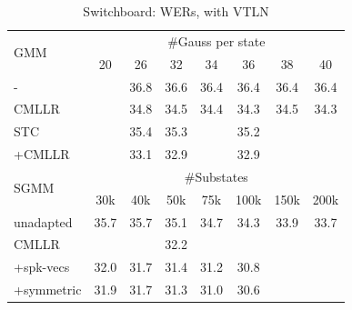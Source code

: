 \documentclass{article}
\begin{document}
\begin{table}[h]
 \renewcommand\arraycolsep{-0.1in}
  \begin{tabular}{|l|ccccccc|}           \hline 
 \multirow{2}{*}{GMM}
            &     \multicolumn{7}{c|}{\#Gauss per state}     \\
            &   20  &  26    &   32  &  34    &   36    &   38   & 40   \\  \cline{2-8}
 -          &       & 36.8   & 36.6  & 36.4   &  36.4   &  36.4  & 36.4  \\  
 CMLLR      &       & 34.8   & 34.5  & 34.4   & 34.3    & 34.5   & 34.3  \\
 STC        &       & 35.4   & 35.3  &        &  35.2   &        &      \\
    +CMLLR  &       & 33.1   & 32.9  &        &  32.9   &        &      \\ \hline
 \multirow{2}{*}{SGMM} 
            &    \multicolumn{7}{c|}{\#Substates}                      \\
            & 30k   &  40k  &   50k  &  75k   &  100k  &  150k  & 200k \\  \cline{2-8}
 unadapted  &  35.7 & 35.7  &  35.1  & 34.7   & 34.3   &  33.9  & 33.7  \\ 
  CMLLR     &       &       &  32.2  &        &        &        &       \\
 +spk-vecs  &  32.0 & 31.7  &  31.4  & 31.2   & 30.8   &        &       \\ 
\hspace{-0.08in}
 +symmetric\hspace{-0.1in} &  31.9& 31.7   & 31.3   & 31.0   & 30.6   &        &       \\ \hline
  \end{tabular}
   \caption{Switchboard: WERs, with VTLN}
 \label{tab:switchboard:vtln}
\end{table}
\end{document}
